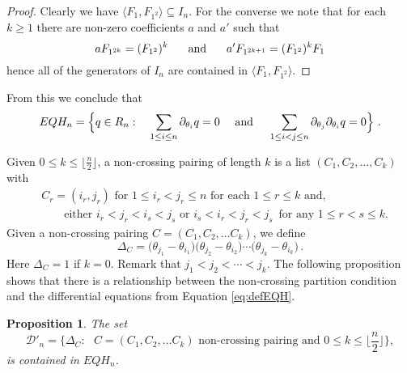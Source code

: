 \documentclass[11pt]{amsart}
\newtheorem{prop}[theorem]{Proposition}
\theoremstyle{definition}
\numberwithin{equation}{section}
\begin{document}
\begin{proof} Clearly we have $ \langle F_1, F_{1^2}  \rangle \subseteq I_n$. 
For the converse we note that for each $k\geq 1$
there are non-zero coefficients $a$ and $a'$ such that
\[
a F_{1^{2k}} = (F_{1^2})^k \hskip .2in\hbox{   and   }\hskip .2in a' F_{1^{2k+1}} = (F_{1^2})^k F_1
\]
hence all of the generators of $I_n$ are contained in $\langle F_1, F_{1^2}  \rangle$.
\end{proof}
From this we conclude that 
\begin{equation}\label{eq:defEQH}
EQH_n =  \Big\{ q \in R_n :  \quad\sum_{1\le i\le n} \partial_{\theta_i}q= 0 \quad\hbox{ and  }\quad \sum_{1\le i<j\le n} \partial_{\theta_j}\partial_{\theta_i}q= 0 \Big\}~.
\end{equation}

Given $0\le k\le \lfloor \frac{n}{2}\rfloor$, a non-crossing pairing of length $k$ is a
list $(C_1, C_2, \ldots, C_k)$ with
\begin{align*}
 &C_r=(i_r,j_r) \text{ for $1\le i_r<j_r\le n$ for each $1 \leq r \leq k$ and,}\\
 &\qquad \text{either } i_r<j_r<i_s<j_s  \text{ or }  i_s<i_r<j_r<j_s\,\text{ for any $1\le r<s\le k$}. 
\end{align*}
Given a non-crossing pairing $C=(C_1,C_2,\ldots C_k)$, we define
\begin{equation}\label{eq:Deltadef}
\Delta_C = \big(\theta_{j_1}-\theta_{i_1}\big)\big(\theta_{j_2}-\theta_{i_2}\big)\cdots \big(\theta_{j_k}-\theta_{i_k}\big)\,.
\end{equation}
Here $\Delta_C=1$ if $k=0$. Remark that $j_1<j_2<\cdots< j_k$.
The following proposition shows that there is a relationship between the non-crossing
partition condition and the differential equations from Equation \eqref{eq:defEQH}.

\begin{prop}\label{prop:harmelem}
The set
$${\mathcal D}'_n =\big\{ \Delta_C: \text{ $C=(C_1,C_2,\ldots C_k)$  non-crossing pairing and $0\le k\le \lfloor \frac{n}{2}\rfloor$}\big\},
$$
is contained in $EQH_n $.
\end{prop}
\end{document}
